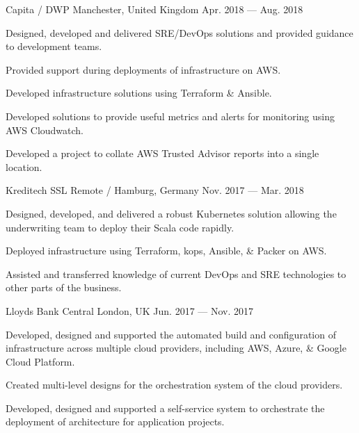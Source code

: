 \begin{cventries}
    {Capita / DWP}
    {Manchester, United Kingdom}
    {Apr. 2018 — Aug. 2018}
    {
        \begin{cvitems}
        \item{Designed, developed and delivered SRE/DevOps solutions and provided guidance to development teams.}
        \item{Provided support during deployments of infrastructure on AWS.}
        \item{Developed infrastructure solutions using Terraform \& Ansible.}
        \item{Developed solutions to provide useful metrics and alerts for monitoring using AWS Cloudwatch.}
        \item{Developed a project to collate AWS Trusted Advisor reports into a single location.}
        \end{cvitems}
    }

    {Kreditech SSL}
    {Remote / Hamburg, Germany}
    {Nov. 2017 — Mar. 2018}
    {
        \begin{cvitems}
        \item{Designed, developed, and delivered a robust Kubernetes solution allowing the underwriting team to deploy their Scala code rapidly.}
        \item{Deployed infrastructure using Terraform, kops, Ansible, \& Packer on AWS.}
        \item{Assisted and transferred knowledge of current DevOps and SRE technologies to other parts of the business.}
        \end{cvitems}
    }

    {Lloyds Bank}
    {Central London, UK}
    {Jun. 2017 — Nov. 2017}
    {
        \begin{cvitems}
        \item {Developed, designed and supported the automated build and configuration of infrastructure across multiple cloud providers, including AWS, Azure, \& Google Cloud Platform.}
        \item {Created multi-level designs for the orchestration system of the cloud providers.}
        \item {Developed, designed and supported a self-service system to orchestrate the deployment of architecture for application projects.}
        \end{cvitems}
    }


\end{cventries}
